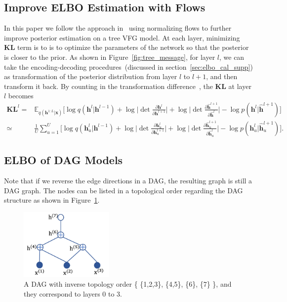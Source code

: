 \documentclass[sigconf, anonymous, review]{acmart}
\theoremstyle{plain}
\theoremstyle{definition}
\theoremstyle{remark}
\begin{document}
\subsection{Improve ELBO Estimation with Flows}

In this paper we follow the approach in~\cite{rezende2015variational,kingma2016improving,berg2018sylvester}  using normalizing flows to further improve posterior estimation on a tree VFG model. At each layer,  minimizing  $\mathbf{KL}$ term is to is to optimize the parameters of the network so that the posterior is closer to the prior. As shown in Figure~\ref{fig:tree_message}, for layer $l$,  we can take the  encoding-decoding procedures~(discussed in section~\ref{sec:elbo_cal_supp}) as transformation of the posterior distribution from layer $l$ to $l+1$, and then transform it back. By  counting in the transformation difference~\cite{rezende2015variational,kingma2016improving,berg2018sylvester}, the $\mathbf{KL}$ at layer $l$ becomes 
{\small
\begin{align*}
\mathbf{KL}^l=&\mathbb{E}_{q(\mathbf{h}^{1:L}|\mathbf{x})}\bigg[  \log q(\mathbf{h}^{l}|\mathbf{h}^{l-1}) +\log \bigg|\det \frac{\partial \mathbf{h}^{l}}{\partial \mathbf{h}^{l+1}}\bigg|  + \log \bigg|\det \frac{\partial \widehat{\mathbf{h}}^{l+1}}{\partial \widehat{\mathbf{h}}^{l}}\bigg|   - \log p(\mathbf{h}^{l}|\widehat{\mathbf{h}}^{l+1}) \bigg]\\
\simeq & \frac{1}{U}\sum_{u=1}^U\bigg[ \log q(\mathbf{h}^{l}_u|\mathbf{h}^{l-1}) +\log \bigg|\det \frac{\partial \mathbf{h}^{l}_u}{\partial \mathbf{h}^{l+1}_u}\bigg|  + \log \bigg|\det \frac{\partial \widehat{\mathbf{h}}^{l+1}_u}{\partial \widehat{\mathbf{h}}^{l}_u}\bigg|   - \log p(\mathbf{h}^{l}_u|\widehat{\mathbf{h}}_u^{l+1}) \bigg].
\end{align*}}





\subsection{ELBO of DAG Models}\label{appd:dag_elbo}
Note that if we reverse the edge directions in a DAG, the resulting graph is still a DAG graph.  
The nodes can be listed in a topological order regarding the DAG structure as shown in Figure~\ref{fig:dag}. 

\begin{figure}[H]
    \centering
    \includegraphics[width=1.8in]{fig/dag.png}
    \caption{A DAG  with inverse topology order \big\{ \{1,2,3\}, \{4,5\}, \{6\},  \{7\} \big\}, and they  correspond to layers 0 to 3.  }
    \label{fig:dag}
\end{figure}
\end{document}
